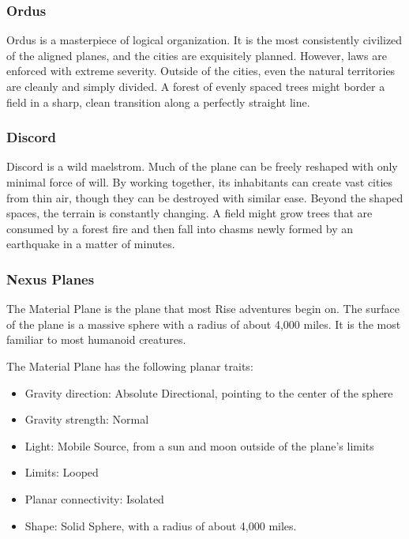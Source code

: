     \subsubsection{Ordus}
      Ordus is a masterpiece of logical organization.
      It is the most consistently civilized of the aligned planes, and the cities are exquisitely planned.
      However, laws are enforced with extreme severity.
      Outside of the cities, even the natural territories are cleanly and simply divided.
      A forest of evenly spaced trees might border a field in a sharp, clean transition along a perfectly straight line.

    \subsubsection{Discord}
      Discord is a wild maelstrom.
      Much of the plane can be freely reshaped with only minimal force of will.
      By working together, its inhabitants can create vast cities from thin air, though they can be destroyed with similar ease.
      Beyond the shaped spaces, the terrain is constantly changing.
      A field might grow trees that are consumed by a forest fire and then fall into chasms newly formed by an earthquake in a matter of minutes.

    \subsubsection{Nexus Planes}

      The Material Plane is the plane that most Rise adventures begin on.
      The surface of the plane is a massive sphere with a radius of about 4,000 miles.
      It is the most familiar to most humanoid creatures.

      The Material Plane has the following planar traits:
      \begin{itemize}
        \item Gravity direction: Absolute Directional, pointing to the center of the sphere
        \item Gravity strength: Normal
        \item Light: Mobile Source, from a sun and moon outside of the plane's limits
        \item Limits: Looped
        \item Planar connectivity: Isolated
        \item Shape: Solid Sphere, with a radius of about 4,000 miles.
      \end{itemize}

